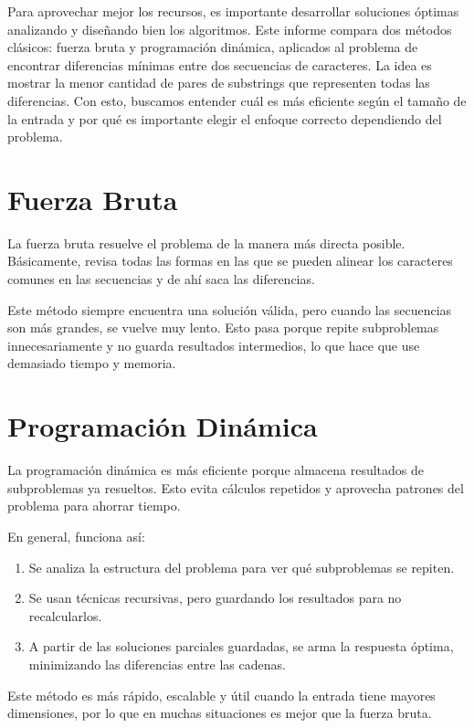 Para aprovechar mejor los recursos, es importante desarrollar soluciones óptimas analizando y diseñando bien los algoritmos. Este informe compara dos métodos clásicos: fuerza bruta y programación dinámica, aplicados al problema de encontrar diferencias mínimas entre dos secuencias de caracteres. La idea es mostrar la menor cantidad de pares de substrings que representen todas las diferencias. Con esto, buscamos entender cuál es más eficiente según el tamaño de la entrada y por qué es importante elegir el enfoque correcto dependiendo del problema.

\section{Fuerza Bruta}

La fuerza bruta resuelve el problema de la manera más directa posible. Básicamente, revisa todas las formas en las que se pueden alinear los caracteres comunes en las secuencias y de ahí saca las diferencias.

Este método siempre encuentra una solución válida, pero cuando las secuencias son más grandes, se vuelve muy lento. Esto pasa porque repite subproblemas innecesariamente y no guarda resultados intermedios, lo que hace que use demasiado tiempo y memoria.

\section{Programación Dinámica}

La programación dinámica es más eficiente porque almacena resultados de subproblemas ya resueltos. Esto evita cálculos repetidos y aprovecha patrones del problema para ahorrar tiempo.

En general, funciona así:
\begin{enumerate}
    \item Se analiza la estructura del problema para ver qué subproblemas se repiten.
    \item Se usan técnicas recursivas, pero guardando los resultados para no recalcularlos.
    \item A partir de las soluciones parciales guardadas, se arma la respuesta óptima, minimizando las diferencias entre las cadenas.
\end{enumerate}

Este método es más rápido, escalable y útil cuando la entrada tiene mayores dimensiones, por lo que en muchas situaciones es mejor que la fuerza bruta.

